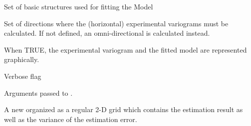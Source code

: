 \begin{Arguments}
\begin{ldescription}
\item[\code{struct}] 
Set of basic structures used for fitting the Model

\item[\code{dirvect}] 
Set of directions where the (horizontal) experimental variograms must be
calculated. If not defined, an omni-directional is calculated instead.

\item[\code{draw.model}] 
When TRUE, the experimental variogram and the fitted model are represented
graphically.

\item[\code{verbose}] 
Verbose flag

\item[\code{...}] 
Arguments passed to .

\end{ldescription}
\end{Arguments}
%
\begin{Value}
A new  organized as a regular 2-D grid which contains
the estimation result as well as the variance of the estimation error.
\end{Value}
